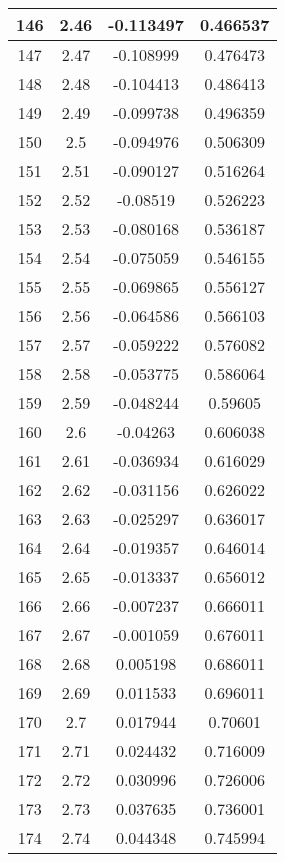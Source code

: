 \begin{table}
\begin{center}
\begin{tabular}{c|c|c|c}
			\hline
			146 & 2.46 & -0.113497 & 0.466537 \\
			\hline
			147 & 2.47 & -0.108999 & 0.476473 \\
			\hline
			148 & 2.48 & -0.104413 & 0.486413 \\
			\hline
			149 & 2.49 & -0.099738 & 0.496359 \\
			\hline
			150 & 2.5 & -0.094976 & 0.506309 \\
			\hline
			151 & 2.51 & -0.090127 & 0.516264 \\
			\hline
			152 & 2.52 & -0.08519 & 0.526223 \\
			\hline
			153 & 2.53 & -0.080168 & 0.536187 \\
			\hline
			154 & 2.54 & -0.075059 & 0.546155 \\
			\hline
			155 & 2.55 & -0.069865 & 0.556127 \\
			\hline
			156 & 2.56 & -0.064586 & 0.566103 \\
			\hline
			157 & 2.57 & -0.059222 & 0.576082 \\
			\hline
			158 & 2.58 & -0.053775 & 0.586064 \\
			\hline
			159 & 2.59 & -0.048244 & 0.59605 \\
			\hline
			160 & 2.6 & -0.04263 & 0.606038 \\
			\hline
			161 & 2.61 & -0.036934 & 0.616029 \\
			\hline
			162 & 2.62 & -0.031156 & 0.626022 \\
			\hline
			163 & 2.63 & -0.025297 & 0.636017 \\
			\hline
			164 & 2.64 & -0.019357 & 0.646014 \\
			\hline
			165 & 2.65 & -0.013337 & 0.656012 \\
			\hline
			166 & 2.66 & -0.007237 & 0.666011 \\
			\hline
			167 & 2.67 & -0.001059 & 0.676011 \\
			\hline
			168 & 2.68 & 0.005198 & 0.686011 \\
			\hline
			169 & 2.69 & 0.011533 & 0.696011 \\
			\hline
			170 & 2.7 & 0.017944 & 0.70601 \\
			\hline
			171 & 2.71 & 0.024432 & 0.716009 \\
			\hline
			172 & 2.72 & 0.030996 & 0.726006 \\
			\hline
			173 & 2.73 & 0.037635 & 0.736001 \\
			\hline
			174 & 2.74 & 0.044348 & 0.745994 \\
			\hline

\end{tabular}
\end{center}
\end{table}
